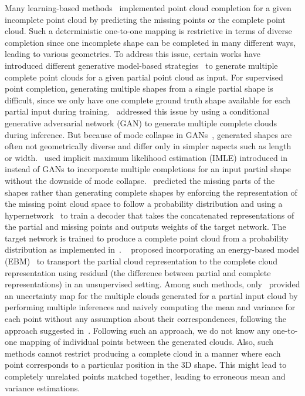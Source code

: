 Many learning-based methods~\cite{PCN, PoinTr, PointAttN, P2C, VarPCN, PCNSkip, Snowflake} implemented point cloud completion for a given incomplete point cloud by predicting the missing points or the complete point cloud. Such a deterministic one-to-one mapping is restrictive in terms of diverse completion since one incomplete shape can be completed in many different ways, leading to various geometries. To address this issue, certain works have introduced different generative model-based strategies~\cite{HyperPocket, CGAN, PCCIMLE, EBResLT} to generate multiple complete point clouds for a given partial point cloud as input. For supervised point completion, generating multiple shapes from a single partial shape is difficult, since we only have one complete ground truth shape available for each partial input during training.~\cite{CGAN} addressed this issue by using a conditional generative adversarial network (GAN) to generate multiple complete clouds during inference. But because of mode collapse in GANs~\cite{ModeCollapseGAN}, generated shapes are often not geometrically diverse and differ only in simpler aspects such as length or width.~\cite{PCCIMLE} used implicit maximum likelihood estimation (IMLE) introduced in~\cite{IMLE} instead of GANs to incorporate multiple completions for an input partial shape without the downside of mode collapse.~\cite{HyperPocket} predicted the missing parts of the shapes rather than generating complete shapes by enforcing the representation of the missing point cloud space to follow a probability distribution and using a hypernetwork~\cite{Hypernet} to train a decoder that takes the concatenated representations of the partial and missing points and outputs weights of the target network. The target network is trained to produce a complete point cloud from a probability distribution as implemented in~\cite{PCHypernet}. ~\cite{EBResLT} proposed incorporating an energy-based model (EBM)~\cite{EBM} to transport the partial cloud representation to the complete cloud representation using residual (the difference between partial and complete representations) in an unsupervised setting. Among such methods, only~\cite{EBResLT} provided an uncertainty map for the multiple clouds generated for a partial input cloud by performing multiple inferences and naively computing the mean and variance for each point without any assumption about their correspondences, following the approach suggested in~\cite{UncertDeepL}. Following such an approach, we do not know any one-to-one mapping of individual points between the generated clouds. Also, such methods cannot restrict producing a complete cloud in a manner where each point corresponds to a particular position in the 3D shape. This might lead to completely unrelated points matched together, leading to erroneous mean and variance estimations.

